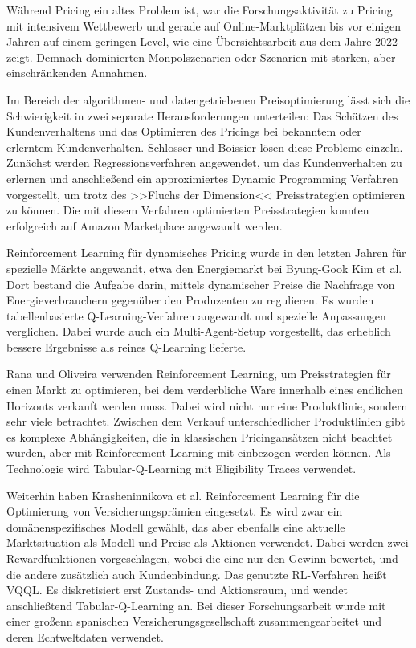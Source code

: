 Während Pricing ein altes Problem ist, war die Forschungsaktivität zu Pricing mit intensivem Wettbewerb und gerade auf Online-Marktplätzen bis vor einigen Jahren auf einem geringen Level, wie eine Übersichtsarbeit aus dem Jahre 2022 zeigt. \cite{Gerpott2022}
Demnach dominierten Monpolszenarien oder Szenarien mit starken, aber einschränkenden Annahmen.

Im Bereich der algorithmen- und datengetriebenen Preisoptimierung lässt sich die Schwierigkeit in zwei separate Herausforderungen unterteilen: Das Schätzen des Kundenverhaltens und das Optimieren des Pricings bei bekanntem oder erlerntem Kundenverhalten.
Schlosser und Boissier \cite{10.1145/3219819.3219833} lösen diese Probleme einzeln.
Zunächst werden Regressionsverfahren angewendet, um das Kundenverhalten zu erlernen und anschließend ein approximiertes Dynamic Programming Verfahren vorgestellt, um trotz des >>Fluchs der Dimension<< Preisstrategien optimieren zu können.
Die mit diesem Verfahren optimierten Preisstrategien konnten erfolgreich auf Amazon Marketplace angewandt werden.

Reinforcement Learning für dynamisches Pricing wurde in den letzten Jahren für spezielle Märkte angewandt, etwa den Energiemarkt bei Byung-Gook Kim et al. \cite{Kim2016DynamicPA}
Dort bestand die Aufgabe darin, mittels dynamischer Preise die Nachfrage von Energieverbrauchern gegenüber den Produzenten zu regulieren.
Es wurden tabellenbasierte Q-Learning-Verfahren angewandt und spezielle Anpassungen verglichen.
Dabei wurde auch ein Multi-Agent-Setup vorgestellt, das erheblich bessere Ergebnisse als reines Q-Learning lieferte.

Rana und Oliveira \cite{RANA2015426} verwenden Reinforcement Learning, um Preisstrategien für einen Markt zu optimieren, bei dem verderbliche Ware innerhalb eines endlichen Horizonts verkauft werden muss.
Dabei wird nicht nur eine Produktlinie, sondern sehr viele betrachtet.
Zwischen dem Verkauf unterschiedlicher Produktlinien gibt es komplexe Abhängigkeiten, die in klassischen Pricingansätzen nicht beachtet wurden, aber mit Reinforcement Learning mit einbezogen werden können.
Als Technologie wird Tabular-Q-Learning mit Eligibility Traces verwendet.

Weiterhin haben Krasheninnikova et al. Reinforcement Learning für die Optimierung von Versicherungsprämien eingesetzt.
Es wird zwar ein domänenspezifisches Modell gewählt, das aber ebenfalls eine aktuelle Marktsituation als Modell und Preise als Aktionen verwendet.
Dabei werden zwei Rewardfunktionen vorgeschlagen, wobei die eine nur den Gewinn bewertet, und die andere zusätzlich auch Kundenbindung.
Das genutzte RL-Verfahren heißt VQQL.
Es diskretisiert erst Zustands- und Aktionsraum, und wendet anschließtend Tabular-Q-Learning an.
Bei dieser Forschungsarbeit wurde mit einer großenn spanischen Versicherungsgesellschaft zusammengearbeitet und deren Echtweltdaten verwendet.

